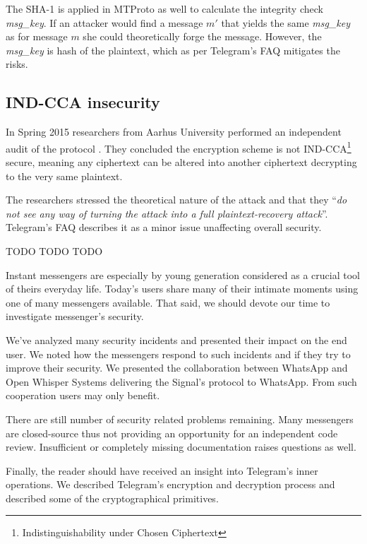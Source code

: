 \documentclass[thesis=M,english]{FITthesis}[2012/10/20]
\begin{document}
The SHA-1 is applied in MTProto as well to calculate the integrity check \emph{msg\_key}. If an attacker would find a message $m'$ that yields the same \emph{msg\_key} as for message $m$ she could theoretically forge the message. However, the \emph{msg\_key} is hash of the plaintext, which as per Telegram's FAQ \cite{telegram-techfaq} mitigates the risks.

\subsection{IND-CCA insecurity}

In Spring 2015 researchers from Aarhus University performed an independent audit of the protocol \cite{telegram-aarhus}. They concluded the encryption scheme is not IND-CCA\footnote{Indistinguishability under Chosen Ciphertext} secure, meaning any ciphertext can be altered into another ciphertext decrypting to the very same plaintext.

The researchers stressed the theoretical nature of the attack and that they ``\emph{do not see any way of turning the attack into a full plaintext-recovery attack}''\cite{telegram-aarhus}. Telegram's FAQ describes it as a minor issue unaffecting overall security. \cite{telegram-techfaq}




\begin{conclusion}

TODO TODO TODO

Instant messengers are especially by young generation considered as a crucial tool of theirs everyday life. Today's users share many of their intimate moments using one of many messengers available. That said, we should devote our time to investigate messenger's security.

We've analyzed many security incidents and presented their impact on the end user. We noted how the messengers respond to such incidents and if they try to improve their security. We presented the collaboration between WhatsApp and Open Whisper Systems delivering the Signal's protocol to WhatsApp. From such cooperation users may only benefit.

There are still number of security related problems remaining. Many messengers are closed-source thus not providing an opportunity for an independent code review. Insufficient or completely missing documentation raises questions as well.

Finally, the reader should have received an insight into Telegram's inner operations. We described Telegram's encryption and decryption process and described some of the cryptographical primitives.

\end{conclusion}
\end{document}
